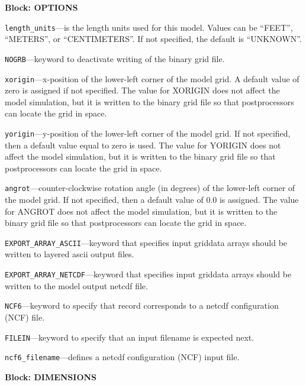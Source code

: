 
\item \textbf{Block: OPTIONS}

\begin{description}
\item \texttt{length\_units}---is the length units used for this model.  Values can be ``FEET'', ``METERS'', or ``CENTIMETERS''.  If not specified, the default is ``UNKNOWN''.

\item \texttt{NOGRB}---keyword to deactivate writing of the binary grid file.

\item \texttt{xorigin}---x-position of the lower-left corner of the model grid.  A default value of zero is assigned if not specified.  The value for XORIGIN does not affect the model simulation, but it is written to the binary grid file so that postprocessors can locate the grid in space.

\item \texttt{yorigin}---y-position of the lower-left corner of the model grid.  If not specified, then a default value equal to zero is used.  The value for YORIGIN does not affect the model simulation, but it is written to the binary grid file so that postprocessors can locate the grid in space.

\item \texttt{angrot}---counter-clockwise rotation angle (in degrees) of the lower-left corner of the model grid.  If not specified, then a default value of 0.0 is assigned.  The value for ANGROT does not affect the model simulation, but it is written to the binary grid file so that postprocessors can locate the grid in space.

\item \texttt{EXPORT\_ARRAY\_ASCII}---keyword that specifies input griddata arrays should be written to layered ascii output files.

\item \texttt{EXPORT\_ARRAY\_NETCDF}---keyword that specifies input griddata arrays should be written to the model output netcdf file.

\item \texttt{NCF6}---keyword to specify that record corresponds to a netcdf configuration (NCF) file.

\item \texttt{FILEIN}---keyword to specify that an input filename is expected next.

\item \texttt{ncf6\_filename}---defines a netcdf configuration (NCF) input file.

\end{description}
\item \textbf{Block: DIMENSIONS}

